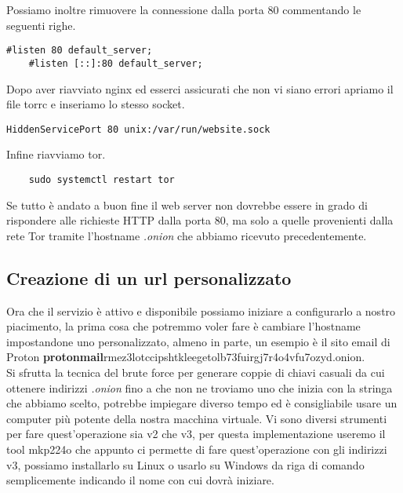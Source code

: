 Possiamo inoltre rimuovere la connessione dalla porta 80 commentando le seguenti righe.
\begin{lstlisting}[caption={Rimozione connessione dalla porta 80}]
    #listen 80 default_server;
    #listen [::]:80 default_server;
\end{lstlisting}


Dopo aver riavviato nginx ed esserci assicurati che non vi siano errori apriamo il file torrc e inseriamo lo stesso socket.
\begin{lstlisting}[caption={Aggiunta socket unix a torrc}]
    HiddenServicePort 80 unix:/var/run/website.sock
\end{lstlisting}

Infine riavviamo tor.
\begin{lstlisting}
    sudo systemctl restart tor
\end{lstlisting}
Se tutto è andato a buon fine il web server non dovrebbe essere in grado di rispondere alle richieste HTTP dalla porta 80, ma solo a quelle provenienti dalla rete Tor tramite l'hostname \emph{.onion} che abbiamo ricevuto precedentemente. \\

\newpage
\subsection{Creazione di un url personalizzato}
Ora che il servizio è attivo e disponibile possiamo iniziare a configurarlo a nostro piacimento, la prima cosa che potremmo voler fare è cambiare l'hostname impostandone uno personalizzato, almeno in parte, un esempio è il sito email di Proton \textbf{protonmail}rmez3lotccipshtkleegetolb73fuirgj7r4o4vfu7ozyd.onion. \\
Si sfrutta la tecnica del brute force per generare coppie di chiavi casuali da cui ottenere indirizzi \emph{.onion} fino a che non ne troviamo uno che inizia con la stringa che abbiamo scelto, potrebbe impiegare diverso tempo ed è consigliabile usare un computer più potente della nostra macchina virtuale. 
Vi sono diversi strumenti per fare quest'operazione sia v2 che v3, per questa implementazione useremo il tool mkp224o \cite{V3AddressGeneratorRepo} che appunto ci permette di fare quest'operazione con gli indirizzi v3, possiamo installarlo su Linux o usarlo su Windows da riga di comando semplicemente indicando il nome con cui dovrà iniziare.

